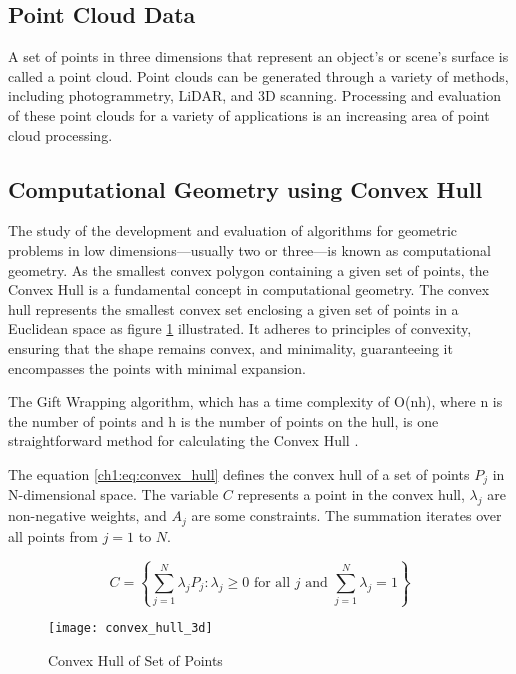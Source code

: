 \subsection{Point Cloud Data}
A set of points in three dimensions that represent an object's or scene's surface is called a point cloud. Point clouds can be generated through a variety of methods, including photogrammetry, LiDAR, and 3D scanning. Processing and evaluation of these point clouds for a variety of applications is an increasing area of point cloud processing.


\subsection{Computational Geometry using Convex Hull}
The study of the development and evaluation of algorithms for geometric problems in low dimensions—usually two or three—is known as computational geometry. As the smallest convex polygon containing a given set of points, the Convex Hull is a fundamental concept in computational geometry. The convex hull represents the smallest convex set enclosing a given set of points in a Euclidean space as figure \ref{ch1:fig:convex_hull_theory} illustrated. It adheres to principles of convexity, ensuring that the shape remains convex, and minimality, guaranteeing it encompasses the points with minimal expansion.

The Gift Wrapping algorithm, which has a time complexity of O(nh), where n is the number of points and h is the number of points on the hull, is one straightforward method for calculating the Convex Hull \citep{barber1996quickhull,chan1996optimal}.

The equation \ref{ch1:eq:convex_hull} defines the convex hull of a set of points $P_j$ in N-dimensional space. The variable $C$ represents a point in the convex hull, $\lambda_j$ are non-negative weights, and $A_j$ are some constraints. The summation iterates over all points from $j=1$ to $N$.

\begin{equation}
	\label{ch1:eq:convex_hull}
	C = \left\{ \sum_{j=1}^{N} \lambda_j P_j: \lambda_j \geq 0 \text{ for all } j \text{ and } \sum_{j=1}^{N} \lambda_j = 1 \right\}
\end{equation}




\begin{figure}[H]
	\centering
	\texttt{[image: convex\_hull\_3d]}
	\caption{Convex Hull of Set of Points}
	\label{ch1:fig:convex_hull_theory}
\end{figure}

